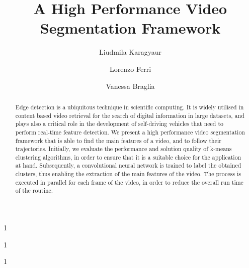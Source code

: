 \documentclass{usiinftr}
\begin{document}
%
%
\title{A High Performance Video Segmentation Framework}

%
%
\author{Liudmila Karagyaur}{1}
\author{Lorenzo Ferri}{1}
\author{Vanessa Braglia}{1}

%
%

%
%

%
%

%
%


\maketitle

\begin{abstract}
Edge detection is a ubiquitous technique in scientific computing. It is widely utilised in content based video retrieval for the search of digital information in large datasets, and plays also a critical role in the development of self-driving vehicles that need to perform real-time feature detection.
We present a high performance video segmentation framework that is able to find the main features of a video, and to follow their trajectories. Initially, we evaluate the performance and solution quality of k-means clustering algorithms, in order to ensure that it is a suitable choice for the application at hand. Subsequently, a convolutional neural network is trained to label the obtained clusters, thus enabling the extraction of the main features of the video. The process is executed in parallel for each frame of the video, in order to reduce the overall run time of the routine.
\end{abstract}
\end{document}
